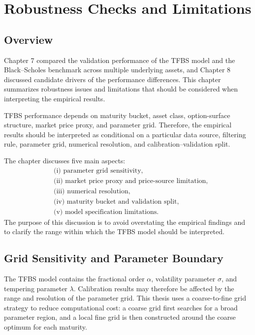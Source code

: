 \documentclass[11pt,a4paper]{report}
\begin{document}
\chapter{Robustness Checks and Limitations}

\section{Overview}

Chapter 7 compared the validation performance of the TFBS model and the Black--Scholes benchmark across multiple underlying assets, and Chapter 8 discussed candidate drivers of the performance differences. This chapter summarizes robustness issues and limitations that should be considered when interpreting the empirical results.

TFBS performance depends on maturity bucket, asset class, option-surface structure, market price proxy, and parameter grid. Therefore, the empirical results should be interpreted as conditional on a particular data source, filtering rule, parameter grid, numerical resolution, and calibration--validation split.

The chapter discusses five main aspects:
\[
\begin{aligned}
&\text{(i) parameter grid sensitivity},\\
&\text{(ii) market price proxy and price-source limitation},\\
&\text{(iii) numerical resolution},\\
&\text{(iv) maturity bucket and validation split},\\
&\text{(v) model specification limitations}.
\end{aligned}
\]
The purpose of this discussion is to avoid overstating the empirical findings and to clarify the range within which the TFBS model should be interpreted.

\section{Grid Sensitivity and Parameter Boundary}

The TFBS model contains the fractional order $\alpha$, volatility parameter $\sigma$, and tempering parameter $\lambda$. Calibration results may therefore be affected by the range and resolution of the parameter grid. This thesis uses a coarse-to-fine grid strategy to reduce computational cost: a coarse grid first searches for a broad parameter region, and a local fine grid is then constructed around the coarse optimum for each maturity.
\end{document}
